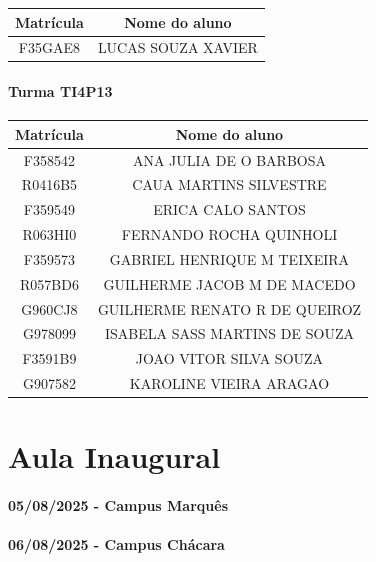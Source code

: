 \documentclass[
]{book}
\begin{document}
\begin{longtable}[]{@{}cc@{}}
\toprule\noalign{}
Matrícula & Nome do aluno \\
\midrule\noalign{}
\endhead
\bottomrule\noalign{}
\endlastfoot
F35GAE8 & LUCAS SOUZA XAVIER \\
\end{longtable}

\subsubsection{Turma TI4P13}\label{turma-ti4p13}

\begin{longtable}[]{@{}cc@{}}
\toprule\noalign{}
Matrícula & Nome do aluno \\
\midrule\noalign{}
\endhead
\bottomrule\noalign{}
\endlastfoot
F358542 & ANA JULIA DE O BARBOSA \\
R0416B5 & CAUA MARTINS SILVESTRE \\
F359549 & ERICA CALO SANTOS \\
R063HI0 & FERNANDO ROCHA QUINHOLI \\
F359573 & GABRIEL HENRIQUE M TEIXEIRA \\
R057BD6 & GUILHERME JACOB M DE MACEDO \\
G960CJ8 & GUILHERME RENATO R DE QUEIROZ \\
G978099 & ISABELA SASS MARTINS DE SOUZA \\
F3591B9 & JOAO VITOR SILVA SOUZA \\
G907582 & KAROLINE VIEIRA ARAGAO \\
\end{longtable}

\chapter{Aula Inaugural}\label{aula-inaugural}

\subsubsection*{05/08/2025 - Campus Marquês}\label{campus-marquuxeas}

\subsubsection*{06/08/2025 - Campus Chácara}\label{campus-chuxe1cara}
\end{document}
